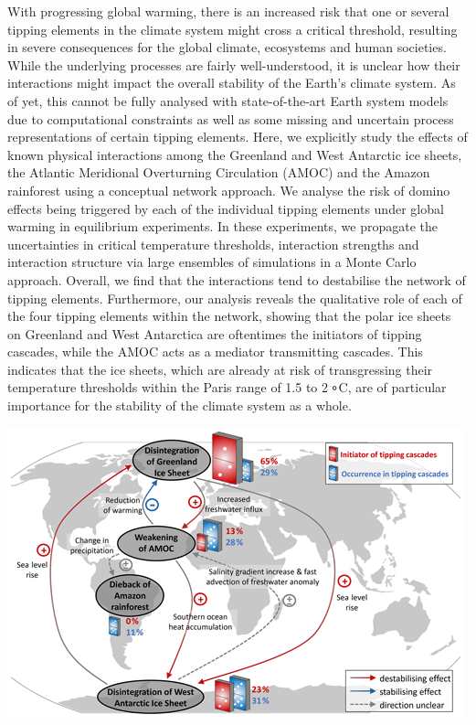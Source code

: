 \documentclass[
]{book}
\begin{document}
With progressing global warming, there is an increased risk that one or several tipping elements in the climate system might cross a critical threshold, resulting in severe consequences for the global climate, ecosystems and human societies. While the underlying processes are fairly well-understood, it is unclear how their interactions might impact the overall stability of the Earth's climate system. As of yet, this cannot be fully analysed with state-of-the-art Earth system models due to computational constraints as well as some missing and uncertain process representations of certain tipping elements. Here, we explicitly study the effects of known physical interactions among the Greenland and West Antarctic ice sheets, the Atlantic Meridional Overturning Circulation (AMOC) and the Amazon rainforest using a conceptual network approach. We analyse the risk of domino effects being triggered by each of the individual tipping elements under global warming in equilibrium experiments. In these experiments, we propagate the uncertainties in critical temperature thresholds, interaction strengths and interaction structure via large ensembles of simulations in a Monte Carlo approach. Overall, we find that the interactions tend to destabilise the network of tipping elements. Furthermore, our analysis reveals the qualitative role of each of the four tipping elements within the network, showing that the polar ice sheets on Greenland and West Antarctica are oftentimes the initiators of tipping cascades, while the AMOC acts as a mediator transmitting cascades. This indicates that the ice sheets, which are already at risk of transgressing their temperature thresholds within the Paris range of 1.5 to 2 ∘C, are of particular importance for the stability of the climate system as a whole.

\includegraphics{fig/tipping_elements.png}
\end{document}
